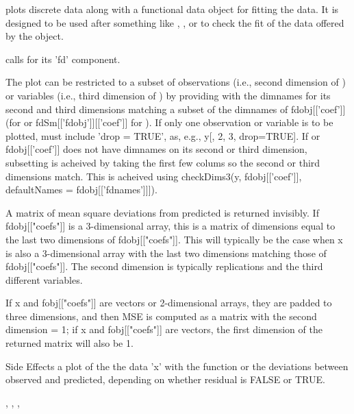 \begin{Details}\relax
{} plots discrete data along with a functional data object
for fitting the data.  It is designed to be used after something like
, ,  or
 to check the fit of the data offered by the
 object.

 calls  for its 'fd' component.

The plot can be restricted to a subset of observations (i.e., second
dimension of ) or variables (i.e., third dimension of
) by providing  with the dimnames for its second and
third dimensions matching a subset of the dimnames of fdobj[['coef']]
(for  or fdSm[['fdobj']][['coef']] for
).  If only one observation or variable is to
be plotted,  must include 'drop = TRUE', as, e.g., y[, 2, 3,
drop=TRUE].  If  or fdobj[['coef']] does not have dimnames on
its second or third dimension, subsetting is acheived by taking the
first few colums so the second or third dimensions match.  This is
acheived using checkDims3(y, fdobj[['coef']], defaultNames =
fdobj[['fdnames']]]).
\end{Details}
\begin{Value}
A matrix of mean square deviations from predicted is returned
invisibly.  If fdobj[["coefs"]] is a 3-dimensional array, this is a
matrix of dimensions equal to the last two dimensions of
fdobj[["coefs"]].  This will typically be the case when x is also a
3-dimensional array with the last two dimensions matching those of
fdobj[["coefs"]].  The second dimension is typically replications and
the third different variables.

If x and fobj[["coefs"]] are vectors or 2-dimensional arrays, they are
padded to three dimensions, and then MSE is computed as a matrix with
the second dimension = 1;  if x and fobj[["coefs"]] are vectors, the
first dimension of the returned matrix will also be 1.
\end{Value}
\begin{Section}{Side Effects}
a plot of the the data 'x' with the function or the deviations between
observed and predicted, depending on whether residual is FALSE or
TRUE.
\end{Section}
\begin{SeeAlso}\relax
{}, 
, 
, 
\end{SeeAlso}
